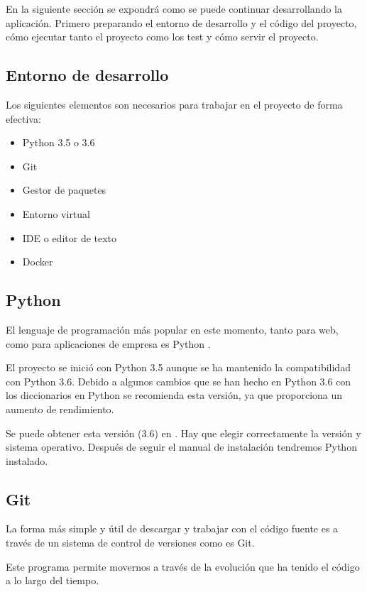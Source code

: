 En la siguiente sección se expondrá como se puede continuar desarrollando la aplicación. Primero preparando el entorno de desarrollo y el código del proyecto, cómo ejecutar tanto el proyecto como los test y cómo servir el proyecto.


\subsection{Entorno de desarrollo}

Los siguientes elementos son necesarios para trabajar en el proyecto de forma efectiva:

\begin{itemize}
\setlength{\itemsep}{1pt}
\setlength{\parskip}{0pt}
\setlength{\parsep}{0pt}
\item Python 3.5 o 3.6
\item Git
\item Gestor de paquetes
\item Entorno virtual
\item IDE o editor de texto
\item Docker
\end{itemize}

\subsection{Python}

El lenguaje de programación más popular en este momento, tanto para web, como para aplicaciones de empresa es Python \cite{ppl}.

El proyecto se inició con Python 3.5 aunque se ha mantenido la compatibilidad con Python 3.6. Debido a algunos cambios que se han hecho en Python 3.6 con los diccionarios en Python se recomienda esta versión, ya que proporciona un aumento de rendimiento.

Se puede obtener esta versión (3.6) en \cite{py}. Hay que elegir correctamente la versión y sistema operativo. Después de seguir el manual de instalación tendremos Python instalado.

\subsection{Git}

La forma más simple y útil de descargar y trabajar con el código fuente es a través de un sistema de control de versiones como es Git.

Este programa permite movernos a través de la evolución que ha tenido el código a lo largo del tiempo.

